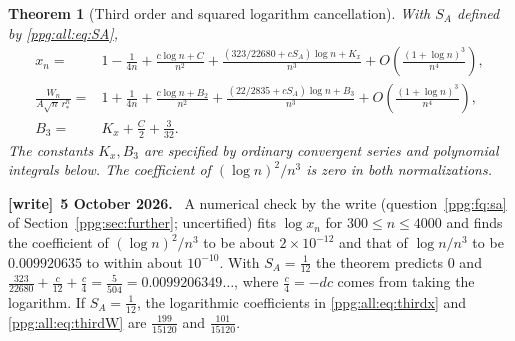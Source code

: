 \documentclass[11pt,letterpaper]{article}
\newtheorem{theorem}{Theorem}[section]
\theoremstyle{remark}\newtheorem{remark}[theorem]{Remark}
\numberwithin{equation}{section}
\newenvironment{writenote}[1][]{\par\smallskip\begingroup\small
 \noindent\textbf{[write]}\if\relax\detokenize{#1}\relax\else~\textbf{#1.}\fi\ }%
 {\par\endgroup\smallskip}
\begin{document}
\begin{theorem}[Third order and squared logarithm cancellation]\label{ppg:all:thm:third}
With $S_A$ defined by \eqref{ppg:all:eq:SA},
\begin{align}
 x_n={}&1-\frac1{4n}+\frac{c\log n+C}{n^2}
  +\frac{(323/22680+cS_A)\log n+K_x}{n^3}
  +O\!\left(\frac{(1+\log n)^3}{n^4}\right),\label{ppg:all:eq:thirdx}\\
 \frac{W_n}{A\sqrt n\,r_*^n}
 ={}&1+\frac1{4n}+\frac{c\log n+B_2}{n^2}
  +\frac{(22/2835+cS_A)\log n+B_3}{n^3}
  +O\!\left(\frac{(1+\log n)^3}{n^4}\right),\label{ppg:all:eq:thirdW}\\
 B_3={}&K_x+\frac C2+\frac3{32}.\label{ppg:all:eq:B3}
\end{align}
The constants $K_x,B_3$ are specified by ordinary convergent series and polynomial integrals below. The coefficient of $(\log n)^2/n^3$ is zero in both normalizations.
\end{theorem}
\begin{writenote}[5 October 2026]
A numerical check by the write (question~\ref{ppg:fq:sa} of Section~\ref{ppg:sec:further}; uncertified) fits $\log x_n$ for $300\le n\le4000$ and finds the coefficient of $(\log n)^2/n^3$ to be about $2\times10^{-12}$ and that of $\log n/n^3$ to be $0.009920635$ to within about $10^{-10}$. With $S_A=\frac1{12}$ the theorem predicts $0$ and $\frac{323}{22680}+\frac c{12}+\frac c4=\frac5{504}=0.0099206349\ldots$, where $\frac c4=-dc$ comes from taking the logarithm. If $S_A=\frac1{12}$, the logarithmic coefficients in \eqref{ppg:all:eq:thirdx} and \eqref{ppg:all:eq:thirdW} are $\frac{199}{15120}$ and $\frac{101}{15120}$.
\end{writenote}
\end{document}
